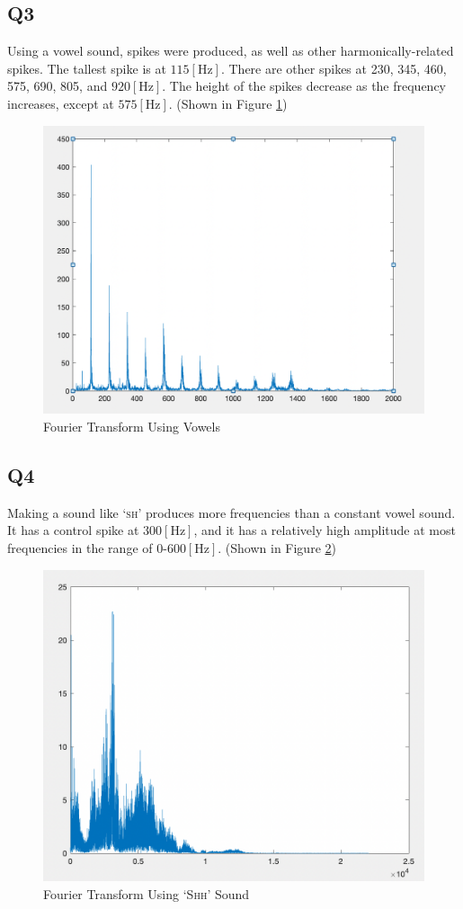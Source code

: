 \documentclass[
	letterpaper, %
	10pt, %
]{CSUniSchoolLabReport}
\begin{document}
\subsection{Q3} Using a vowel sound, spikes were produced, as well as other harmonically-related spikes. The tallest spike is at $115[\si{\hertz}]$. There are other spikes at 230, 345, 460, 575, 690, 805, and $920[\si{\hertz}]$. The height of the spikes decrease as the frequency increases, except at $575[\si{\hertz}]$. (Shown in Figure \ref{fig:5})

\begin{figure}[H]
  \centering
  \includegraphics[width=.9\textwidth]{Figures/L12Q3.png}
  \caption{Fourier Transform Using Vowels}
  \label{fig:5}
\end{figure}

\subsection{Q4} Making a sound like `\textsc{sh}' produces more frequencies than a constant vowel sound. It has a control spike at $300[\si{\hertz}]$, and it has a relatively high amplitude at most frequencies in the range of $0$-$600[\si{\hertz}]$. (Shown in Figure \ref{fig:6})

\begin{figure}[H]
  \centering
  \includegraphics[width=.9\textwidth]{Figures/L12Q4.png}
  \caption{Fourier Transform Using `\textsc{Shh}' Sound}
  \label{fig:6}
\end{figure}
\end{document}
